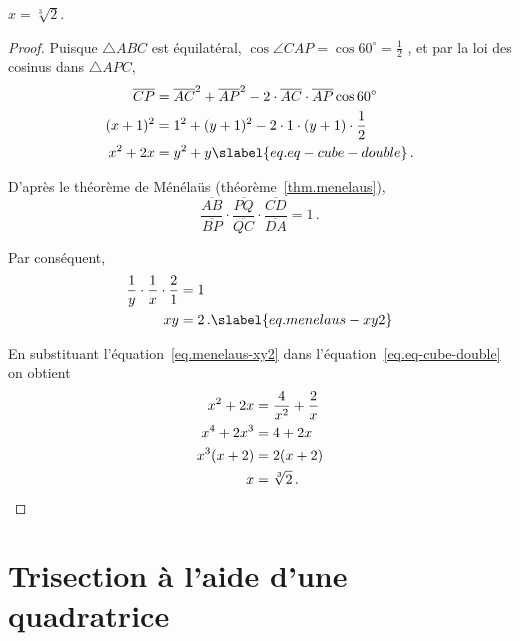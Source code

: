 \begin{theorem}
$x=\sqrt[3]{2}$.
\end{theorem}

\begin{proof}
Puisque $\triangle ABC$ est équilatéral, $\cos \angle CAP=\cos 60^\circ=\frac{1}{2}$ , et par la loi des cosinus dans $\triangle APC$,
\begin{subequations}
\begin{align}
\overline{CP}&=\overline{AC}^2+\overline{AP}^2-2\cdot \overline{AC}\cdot\overline{AP}\cos 60^\circ\\
(x+1)^2&=1^2+(y+1)^2-2\cdot 1\cdot (y+1)\cdot \frac{1}{2}\\
x^2+2x&=y^2+y\slabel{eq.eq-cube-double}\,.
\end{align}
\end{subequations}

D'après le théorème de Ménélaüs (théorème~\ref{thm.menelaus}),
\[
\displaystyle\frac{\overline{AB}}{\overline{BP}}\cdot
\displaystyle\frac{\overline{PQ}}{\overline{QC}}\cdot
\displaystyle\frac{\overline{CD}}{\overline{DA}}=1\,.
\]



Par conséquent,
\begin{subequations}
\begin{align}
\displaystyle\frac{1}{y}\cdot
\displaystyle\frac{1}{x}\cdot
\displaystyle\frac{2}{1}&=1\\
xy&=2\,.\slabel{eq.menelaus-xy2}
\end{align}
\end{subequations}

En substituant l'équation~\ref{eq.menelaus-xy2} dans l'équation~\ref{eq.eq-cube-double} on obtient
\begin{align*}
x^2+2x&=\frac{4}{x^2}+\frac{2}{x}\\
x^4+2x^3&=4+2x\\
x^3(x+2)&=2(x+2)\\
x&=\sqrt[3]{2}\,.\qedhere
\end{align*}
\end{proof}


\section{Trisection à l'aide d'une quadratrice}\label{s.q}



